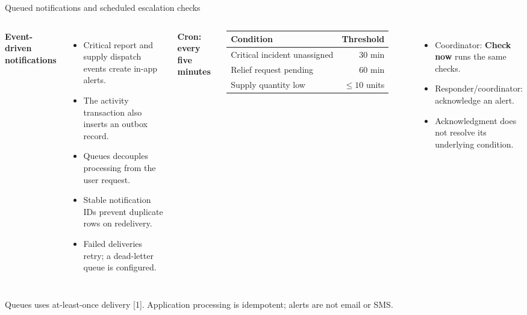 \documentclass[aspectratio=169,10pt]{beamer}
\newcommand{\items}{\setlength\itemsep{.20cm}}
\begin{document}
\begin{frame}{Queued notifications and scheduled escalation checks}
\begin{columns}[T,onlytextwidth]
\textbf{Event-driven notifications}
\begin{itemize}\items
\item Critical report and supply dispatch events create in-app alerts.
\item The activity transaction also inserts an outbox record.
\item Queues decouples processing from the user request.
\item Stable notification IDs prevent duplicate rows on redelivery.
\item Failed deliveries retry; a dead-letter queue is configured.
\end{itemize}
\textbf{Cron: every five minutes}
\vspace{.15cm}

\small
\begin{tabularx}{\linewidth}{@{}Yr@{}}\toprule
\textbf{Condition}&\textbf{Threshold}\\\midrule
Critical incident unassigned & 30 min\\\addlinespace
Relief request pending & 60 min\\\addlinespace
Supply quantity low & $\leq 10$ units\\\bottomrule
\end{tabularx}\par
\vspace{.25cm}
\begin{itemize}\items
\item Coordinator: \textbf{Check now} runs the same checks.
\item Responder/coordinator: acknowledge an alert.
\item Acknowledgment does not resolve its underlying condition.
\end{itemize}
\end{columns}
\vspace{.16cm}
{\scriptsize\color{QFSlate}Queues uses at-least-once delivery [1]. Application processing is idempotent; alerts are not email or SMS.}
\end{frame}
\end{document}
